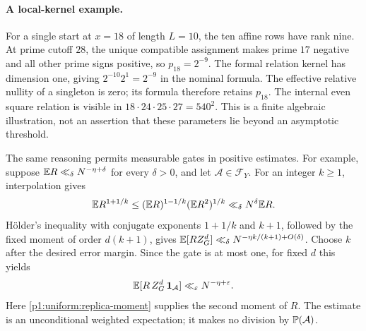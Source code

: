 \paragraph{A local-kernel example.}
For a single start at \(x=18\) of length \(L=10\), the ten affine
rows have rank nine. At prime cutoff \(28\), the unique compatible
assignment makes prime \(17\) negative and all other prime signs
positive, so \(p_{18}=2^{-9}\). The formal relation kernel has
dimension one, giving \(2^{-10}2^1=2^{-9}\) in the nominal formula.
The effective relative nullity of a singleton is zero; its formula
therefore retains \(p_{18}\). The internal even square relation is
visible in \(18\cdot24\cdot25\cdot27=540^2\).
This is a finite algebraic illustration, not an assertion that these
parameters lie beyond an asymptotic threshold.

The same reasoning permits measurable gates in
positive estimates. For example, suppose
\(\E R\ll_\delta N^{-\eta+\delta}\) for every
\(\delta>0\), and let \(\mathcal A\in\mathcal F_Y\).
For an integer \(k\ge1\), interpolation gives
\[
 \E R^{1+1/k}\le(\E R)^{1-1/k}(\E R^2)^{1/k}
       \ll_\delta N^\delta\E R.
\]
H\"older's inequality with conjugate exponents
\(1+1/k\) and \(k+1\), followed by the fixed
moment of order \(d(k+1)\), gives
\(\E[RZ_G^d]\ll_\delta
 N^{-\eta k/(k+1)+O(\delta)}\).
Choose \(k\) after the desired error margin.
Since the gate is at most one, for fixed \(d\) this yields
\[
 \E[R\,Z_G^d\,\ind_{\mathcal A}]
       \ll_\varepsilon N^{-\eta+\varepsilon}.
\]
Here \eqref{p1:uniform:replica-moment} supplies the
second moment of \(R\). The estimate is an
unconditional weighted expectation; it makes
no division by \(\P(\mathcal A)\).
